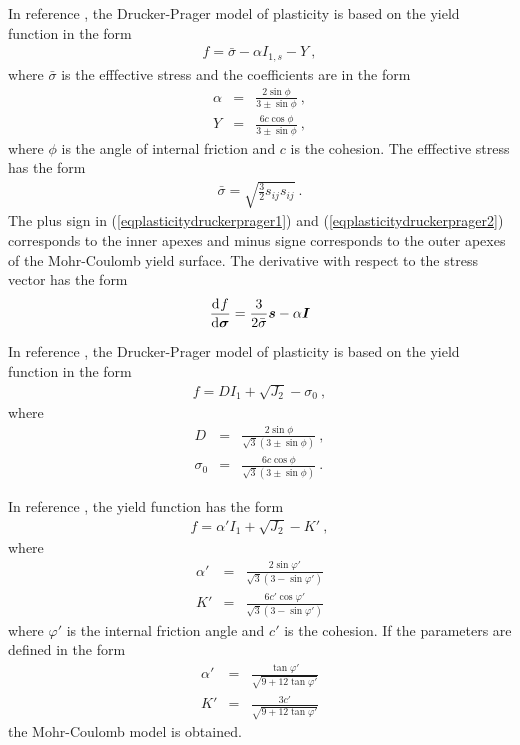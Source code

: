 In reference \cite{belytschko:nonlin}, the Drucker-Prager model of plasticity
is based on the yield function in the form
\begin{eqnarray}
f = \bar{\sigma} - \alpha I_{1,s} - Y\ ,
\end{eqnarray}
where $\bar{\sigma}$ is the efffective stress and
the coefficients are in the form
\begin{eqnarray}\label{eqplasticitydruckerprager1}
\alpha &=& \frac{2 \sin \phi}{3 \pm \sin \phi}\ ,
\\ \label{eqplasticitydruckerprager2}
Y &=& \frac{6 c \cos \phi}{3 \pm \sin \phi}\ ,
\end{eqnarray}
where $\phi$ is the angle of internal friction
and $c$ is the cohesion.
The efffective stress has the form
\begin{eqnarray}
\bar{\sigma} = \sqrt{\frac{3}{2}s_{ij}s_{ij}}\ .
\end{eqnarray}
The plus sign in (\ref{eqplasticitydruckerprager1}) and (\ref{eqplasticitydruckerprager2})
corresponds to the inner apexes and minus signe corresponds to the outer apexes
of the Mohr-Coulomb yield surface.
The derivative with respect to the stress vector has the form
\begin{eqnarray}
\mbox{$\displaystyle\frac{{\rm d}\>\!{f}}{{\rm d}{\mbox{\boldmath$\sigma$}}}$} = \frac{3}{2\bar{\sigma}} \mbox{\boldmath$s$} - \alpha \mbox{\boldmath$I$}
\end{eqnarray}

In reference \cite{crisfield2}, the Drucker-Prager model of plasticity
is based on the yield function in the form
\begin{eqnarray}
f = D I_1 + \sqrt{J_2} - \sigma_0\ ,
\end{eqnarray}
where
\begin{eqnarray}
D &=& \frac{2 \sin \phi}{\sqrt{3}(3 \pm \sin \phi)}\ ,
\\
\sigma_0 &=& \frac{6 c \cos \phi}{\sqrt{3}(3 \pm \sin \phi)}\ .
\end{eqnarray}


In reference \cite{prochazka}, the yield function has the form
\begin{eqnarray}
f = \alpha' I_1 + \sqrt{J_2} - K'\ ,
\end{eqnarray}
where
\begin{eqnarray}
\alpha' &=& \frac{2 \sin \varphi'}{\sqrt{3}(3-\sin \varphi')}
\\
K' &=& \frac{6 c' \cos \varphi'}{\sqrt{3}(3-\sin \varphi')}
\end{eqnarray}
where $\varphi'$ is the internal friction angle and $c'$ is the cohesion.
If the parameters are defined in the form
\begin{eqnarray}
\alpha' &=& \frac{\tan \varphi'}{\sqrt{9+12 \tan \varphi'}}
\\
K' &=& \frac{3 c'}{\sqrt{9+12 \tan \varphi'}}
\end{eqnarray}
the Mohr-Coulomb model is obtained.



